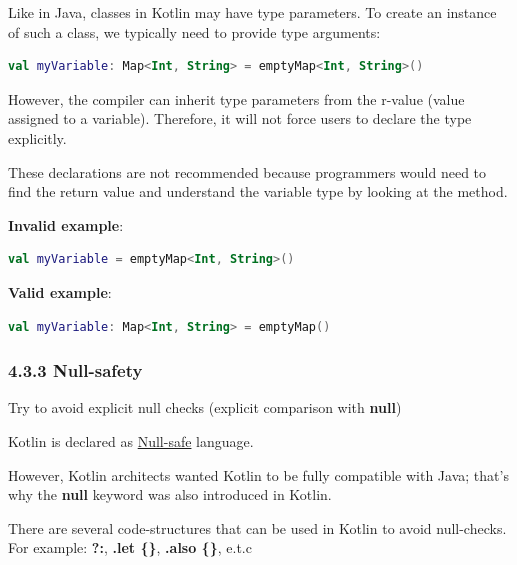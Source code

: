 \label{sec:4.3.2}

Like in Java, classes in Kotlin may have type parameters. To create an instance of such a class, we typically need to provide type arguments:



\begin{lstlisting}[language=Kotlin]
val myVariable: Map<Int, String> = emptyMap<Int, String>() 
\end{lstlisting}


However, the compiler can inherit type parameters from the r-value (value assigned to a variable). Therefore, it will not force users to declare the type explicitly.

These declarations are not recommended because programmers would need to find the return value and understand the variable type by looking at the method.



\textbf{Invalid example}:

\begin{lstlisting}[language=Kotlin]
val myVariable = emptyMap<Int, String>() 
\end{lstlisting}


\textbf{Valid example}:

\begin{lstlisting}[language=Kotlin]
val myVariable: Map<Int, String> = emptyMap() 
\end{lstlisting}


\subsubsection*{\textbf{4.3.3 Null-safety}}
\leavevmode\newline

\label{sec:4.3.3}



Try to avoid explicit null checks (explicit comparison with \textbf{null}) 

Kotlin is declared as \href{https://kotlinlang.org/docs/reference/null-safety.html}{Null-safe} language.

However, Kotlin architects wanted Kotlin to be fully compatible with Java; that's why the \textbf{null} keyword was also introduced in Kotlin. 



There are several code-structures that can be used in Kotlin to avoid null-checks. For example: \textbf{?:},  \textbf{.let \{\}}, \textbf{.also \{\}}, e.t.c




